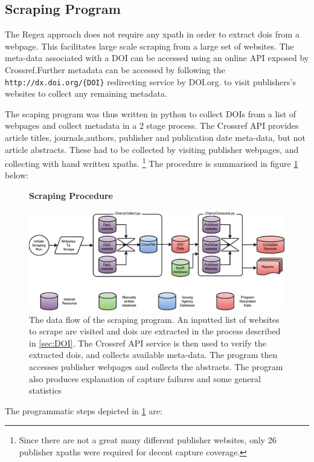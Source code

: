 \subsection{Scraping Program}
\label{sec:SCRAPING_PROGRAM}
The Regex approach does not require any xpath in order to extract dois from a webpage. This facilitates large scale scraping from a large set of websites.
The meta-data associated with a DOI can be accessed using an online API exposed by Crossref.Further metadata can be accessed by following the \texttt{http://dx.doi.org/\{DOI\}} redirecting service by DOI\circledR .org. to visit publishers's websites to collect any remaining metadata. 


The scaping program was thus written in python to collect DOIs from a list of webpages and collect metadata in a 2 stage process. The Crossref API provides article titles, journals,authors, publisher and publication date meta-data, but not article abstracts. These had to be collected by visiting publisher webpages, and collecting with hand written xpaths. \footnote{Since there are not a great many different publisher websites, only 26 publisher xpaths were required for decent capture coverage.} The procedure is summarised in figure \ref{fig:Cherry} below:
\begin{figure}[H]
    \centering
    \textbf{Scraping Procedure}\par\medskip
    \includegraphics[scale=0.5]{Data_Acquisition/Cherry.pdf}
    \caption{The data flow of the scraping program. An inputted list of websites to scrape are visited and dois are extracted in the process described in \ref{sec:DOI}. The Crossref API service is then used to verify the extracted dois, and collects available meta-data. The program then accesses publisher webpages and collects the abstracts. The program also produces explanation of capture failures and some general statistics}
     \label{fig:Cherry}
\end{figure}
The programmatic steps depicted in \ref{fig:Cherry} are:
